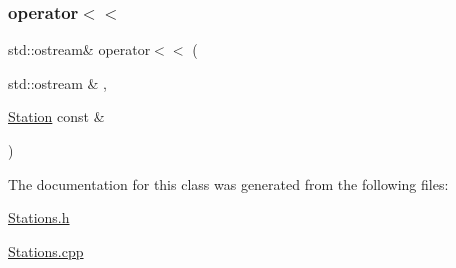 \subsubsection{\texorpdfstring{operator$<$$<$}{operator<<}}
{\footnotesize\ttfamily std\+::ostream\& operator$<$$<$ (\begin{DoxyParamCaption}\item[{std\+::ostream \&}]{,  }\item[{\mbox{\hyperlink{classanen_sta_1_1_station}{Station}} const \&}]{ }\end{DoxyParamCaption})\hspace{0.3cm}{\ttfamily [friend]}}



The documentation for this class was generated from the following files\+:\begin{DoxyCompactItemize}
\item 
\mbox{\hyperlink{_stations_8h}{Stations.\+h}}\item 
\mbox{\hyperlink{_stations_8cpp}{Stations.\+cpp}}\end{DoxyCompactItemize}
